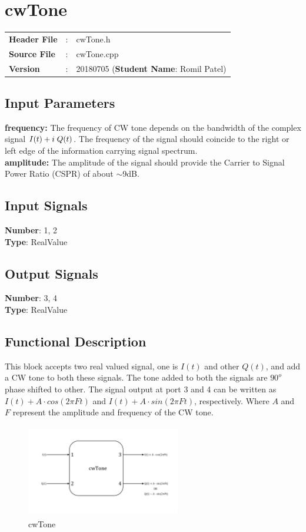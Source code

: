 \clearpage

\section{cwTone}
\begin{tcolorbox}	
	\begin{tabular}{p{2.75cm} p{0.2cm} p{10.5cm}} 	
		\textbf{Header File}   &:& cwTone.h \\
		\textbf{Source File}   &:& cwTone.cpp \\
		\textbf{Version}       &:& 20180705 (\textbf{Student Name}: Romil Patel)
	\end{tabular}
\end{tcolorbox}

\subsection*{Input Parameters}

\textbf{frequency:} The frequency of CW tone depends on the bandwidth of the complex signal $I(t) + i\hspace{0.1cm}Q(t)$. The frequency of the signal should coincide to the right or left edge of the information carrying signal spectrum.
\\
\textbf{amplitude:} The amplitude of the signal should provide the Carrier to Signal Power Ratio (CSPR) of about $\sim$9dB.

\subsection*{Input Signals}
\textbf{Number}: 1, 2\\
\textbf{Type}: RealValue
\subsection*{Output Signals}
\textbf{Number}: 3, 4\\
\textbf{Type}: RealValue

\subsection*{Functional Description}
This block accepts two real valued signal, one is $I(t)$ and other $Q(t)$, and add a CW tone to both these signals. The tone added to both the signals are $90^o$ phase shifted to other. The signal output at port 3 and  4 can be written as $I(t)+A\cdot cos(2\pi Ft)$ and $I(t)+A\cdot sin(2\pi Ft)$, respectively. Where $A$ and $F$ represent the amplitude and frequency of the CW tone.  

\begin{figure}[h]
	\centering
	\includegraphics[width=0.6\textwidth, height=4cm]{./lib/cwTone/figures/cwTone.pdf}
	\caption{cwTone}\label{cwTOne}
\end{figure}